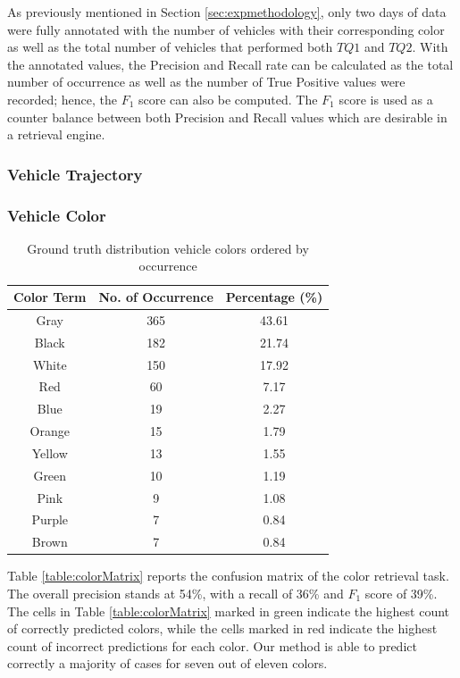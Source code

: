 As previously mentioned in Section \ref{sec:expmethodology}, only two days of data were fully annotated with the number of vehicles with their corresponding color as well as the total number of vehicles that performed both $TQ1$ and $TQ2$. With the annotated values, the Precision and Recall rate can be calculated as the total number of occurrence as well as the number of True Positive values were recorded; hence, the $F_1$ score can also be computed. The $F_1$ score is used as a counter balance between both Precision and Recall values which are desirable in a retrieval engine.    


\subsubsection{Vehicle Trajectory}
\subsubsection{Vehicle Color}

\begin{table}[bht!]
\centering
\caption{Ground truth distribution vehicle colors ordered by occurrence}
\label{table:colorDist}
\begin{tabular}{ccc}
\toprule
Color Term & No. of Occurrence & Percentage (\%)   \\
\midrule
Gray       & 365       & 43.61  \\
Black      & 182       & 21.74  \\
White      & 150       & 17.92  \\
Red        & 60        & 7.17   \\
Blue       & 19        & 2.27   \\
Orange     & 15        & 1.79   \\
Yellow     & 13        & 1.55   \\
Green      & 10        & 1.19   \\
Pink       & 9         & 1.08   \\
Purple     & 7         & 0.84   \\
Brown      & 7         & 0.84   \\
\bottomrule
\end{tabular}
\end{table}


Table \ref{table:colorMatrix} reports the confusion matrix of the color retrieval task. 
The overall precision stands at 54\%, with a recall of 36\% and $F_1$ score of 39\%. The cells in Table \ref{table:colorMatrix} marked in green indicate the highest count of correctly predicted colors, while the cells marked in red indicate the highest count of incorrect predictions for each color. Our method is able to predict correctly a majority of cases for seven out of eleven colors.

